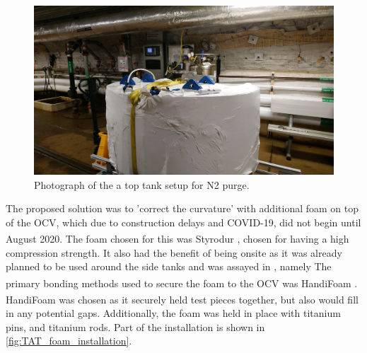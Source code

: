 \begin{figure}[!tbph]
\includegraphics[width=\textwidth]{Figures/Construction/tat_purging.JPG}
\centering
\caption{Photograph of the a top tank setup for N2 purge.}
\label{fig:TAT_purging}
\end{figure}

\par
The proposed solution was to 'correct the curvature' with additional foam on top of the OCV, which due to construction delays and COVID-19, did not begin until August 2020.
The foam chosen for this was Styrodur\textsuperscript{\textregistered} \cite{styrodur_foam_ref}, chosen for having a high compression strength.
It also had the benefit of being onsite as it was already planned to be used around the side tanks and was assayed in \cite{LZ_assay_ref}, namely 
The primary bonding methods used to secure the foam to the OCV was HandiFoam\textsuperscript{\textregistered} \cite{handifoam_ref}.
HandiFoam\textsuperscript{\textregistered} was chosen as it securely held test pieces together, but also would fill in any potential gaps.
Additionally, the foam was held in place with titanium pins, and titanium rods.
Part of the installation is shown in \autoref{fig:TAT_foam_installation}.

